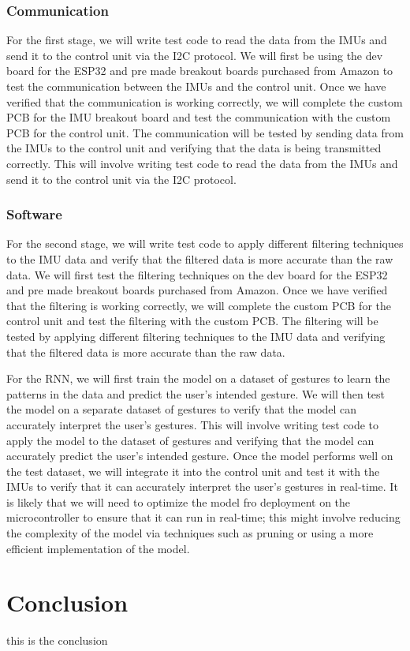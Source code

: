 \documentclass[12pt]{article}
\begin{document}
\subsubsection{Communication}
For the first stage, we will write test code to read the data from the IMUs and send it to the control unit via the I2C protocol. We will first be using the dev board for the ESP32 and pre made breakout boards purchased from Amazon to test the communication between the IMUs and the control unit. Once we have verified that the communication is working correctly, we will complete the custom PCB for the IMU breakout board and test the communication with the custom PCB for the control unit. The communication will be tested by sending data from the IMUs to the control unit and verifying that the data is being transmitted correctly. This will involve writing test code to read the data from the IMUs and send it to the control unit via the I2C protocol.
\subsubsection{Software}
For the second stage, we will write test code to apply different filtering techniques to the IMU data and verify that the filtered data is more accurate than the raw data. We will first test the filtering techniques on the dev board for the ESP32 and pre made breakout boards purchased from Amazon. Once we have verified that the filtering is working correctly, we will complete the custom PCB for the control unit and test the filtering with the custom PCB. The filtering will be tested by applying different filtering techniques to the IMU data and verifying that the filtered data is more accurate than the raw data.

For the RNN, we will first train the model on a dataset of gestures to learn the patterns in the data and predict the user's intended gesture. We will then test the model on a separate dataset of gestures to verify that the model can accurately interpret the user's gestures. This will involve writing test code to apply the model to the dataset of gestures and verifying that the model can accurately predict the user's intended gesture. Once the model performs well on the test dataset, we will integrate it into the control unit and test it with the IMUs to verify that it can accurately interpret the user's gestures in real-time. It is likely that we will need to optimize the model fro deployment on the microcontroller to ensure that it can run in real-time; this might involve reducing the complexity of the model via techniques such as pruning or using a more efficient implementation of the model.
\section{Conclusion}
this is the conclusion 
\newpage

\end{document}
